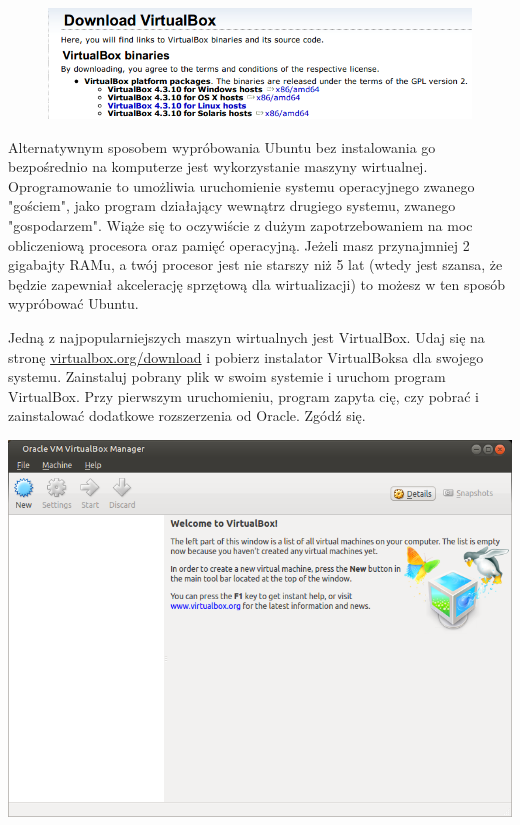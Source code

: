 \begin{figure}
                \includegraphics[width=\linewidth]{images/virtualbox_download.png}
\end{figure}

Alternatywnym sposobem wypróbowania Ubuntu bez instalowania go bezpośrednio na komputerze jest wykorzystanie maszyny wirtualnej. Oprogramowanie to umożliwia uruchomienie systemu operacyjnego zwanego "gościem", jako program działający wewnątrz drugiego systemu, zwanego "gospodarzem". Wiąże się to oczywiście z dużym zapotrzebowaniem na moc obliczeniową procesora oraz pamięć operacyjną. Jeżeli masz przynajmniej 2 gigabajty RAMu, a twój procesor jest nie starszy niż 5 lat (wtedy jest szansa, że będzie zapewniał akcelerację sprzętową dla wirtualizacji) to możesz w ten sposób wypróbować Ubuntu.

Jedną z najpopularniejszych maszyn wirtualnych jest VirtualBox. Udaj się na stronę \href{https://www.virtualbox.org/wiki/Downloads}{virtualbox.org/download} i pobierz instalator VirtualBoksa dla swojego systemu. Zainstaluj pobrany plik w swoim systemie i uruchom program VirtualBox. Przy pierwszym uruchomieniu, program zapyta cię, czy pobrać i zainstalować dodatkowe rozszerzenia od Oracle. Zgódź się.
\clearpage
\begin{center}
        \includegraphics[scale=0.7]{images/virtualbox_main.png}
\end{center}


